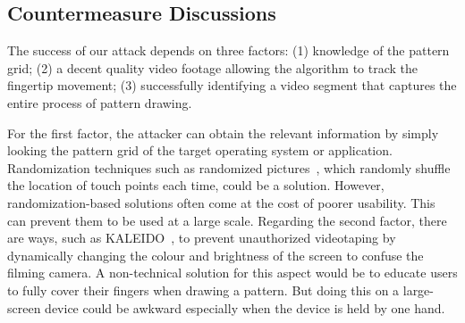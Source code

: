 


\subsection{Countermeasure Discussions}

The success of our attack depends on three factors: (1)
knowledge of the pattern grid; (2) a decent
quality video footage allowing the algorithm to track the fingertip movement;
(3) successfully identifying a video segment that captures the entire process of pattern drawing.

For the first factor, the attacker can obtain the relevant information by simply looking the pattern grid
of the target operating system or application.
Randomization techniques such as
randomized pictures~\cite{biddle2012graphical,hossein2015fortifying}, which randomly shuffle the location
of touch points each time, could be a solution.
However, randomization-based solutions often come at the cost of poorer
usability. This can prevent them to be used at a large scale.
Regarding the second factor, there are ways, such as
KALEIDO~\cite{zhang2015kaleido}, to prevent unauthorized videotaping by
dynamically changing the colour and brightness of the screen to confuse the
filming camera. A non-technical solution for this aspect would be to educate users to
fully cover their fingers when drawing a pattern. But doing this on a large-screen device could be awkward especially when the device is held by one hand.



